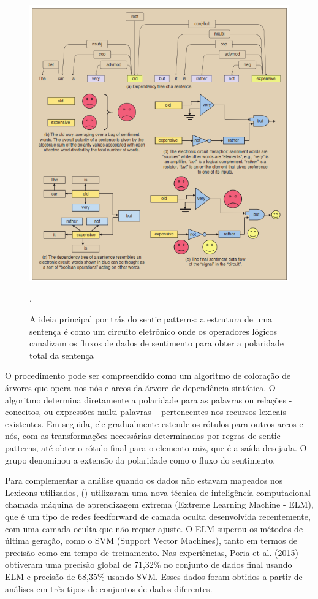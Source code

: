 \documentclass[
	12pt,				%
	openright,			%
	oneside,			%
	a4paper,			%
	english,			%
	spanish,			%
	brazil				%
	]{abntex2}
\begin{document}
\begin{figure}[!htb]
\centering
\includegraphics{senticPatternsCircuit}
\caption{A ideia principal por trás do sentic patterns: a estrutura de uma sentença é como um circuito eletrônico onde os operadores lógicos canalizam os fluxos de dados de sentimento para obter a polaridade total da sentença \cite{article_sentiment_analysis}}.
\label{senticPatternsCircuit}
\end{figure}

O procedimento pode ser compreendido como um algoritmo de coloração de árvores que opera nos nós e arcos da árvore de dependência sintática. O algoritmo determina diretamente a polaridade para as palavras ou relações - conceitos, ou expressões multi-palavras – pertencentes nos recursos lexicais existentes. Em seguida, ele gradualmente estende os rótulos para outros arcos e nós, com as transformações necessárias determinadas por regras de sentic patterns, até obter o rótulo final para o elemento raiz, que é a saída desejada. O grupo denominou a extensão da polaridade como o fluxo do sentimento.

Para complementar a análise quando os dados não estavam mapeados nos Lexicons utilizados,  (\citeyear{article_sentiment_analysis}) utilizaram uma nova técnica de inteligência computacional chamada máquina de aprendizagem extrema (Extreme Learning Machine - ELM), que é um tipo de redes feedforward de camada oculta desenvolvida recentemente, com uma camada oculta que não requer ajuste. O ELM superou os métodos de última geração, como o SVM (Support Vector Machines), tanto em termos de precisão como em tempo de treinamento. Nas experiências, Poria et al. (2015) obtiveram uma precisão global de 71,32\% no conjunto de dados final usando ELM e precisão de 68,35\% usando SVM. Esses dados foram obtidos a partir de análises em três tipos de conjuntos de dados diferentes.
\end{document}
